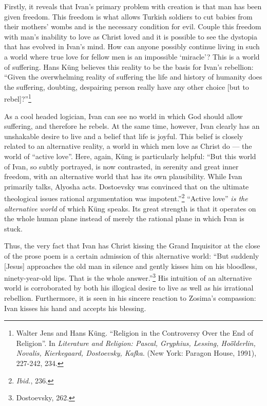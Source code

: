 Firstly, it reveals that Ivan's primary problem with creation is that man has been given freedom. This freedom is what allows Turkish soldiers to cut babies from their mothers' wombs and is the necessary condition for evil. Couple this freedom with man's inability to love as Christ loved and it is possible to see the dystopia that has evolved in Ivan's mind. How can anyone possibly continue living in such a world where true love for fellow men is an impossible `miracle'? This is a world of suffering. Hans K\"{u}ng believes this reality to be the basis for Ivan's rebellion: ``Given the overwhelming reality of suffering the life and history of humanity does the suffering, doubting, despairing person really have any other choice [but to rebel]?''\footnote{Walter Jens and Hans K\"{u}ng. ``Religion in the Controversy Over the End of Religion''. In \emph{Literature and Religion: Pascal, Gryphius, Lessing, Ho\"{o}̈lderlin, Novalis, Kierkegaard, Dostoevsky, Kafka}. (New York: Paragon House, 1991), 227-242, 234.}

As a cool headed logician, Ivan can see no world in which God should allow suffering, and therefore he rebels. At the same time, however, Ivan clearly has an unshakable desire to live and a belief that life is joyful. This belief is closely related to an alternative reality, a world in which men love as Christ do --- the world of ``active love''. Here, again, K\"{u}ng is particularly helpful: ``But this world of Ivan, so subtly portrayed, is now contrasted, in serenity and great inner freedom, with an alternative world that has its own plausibility. While Ivan primarily talks, Alyosha acts. Dostoevsky was convinced that on the ultimate theological issues rational argumentation was impotent.''\footnote{\emph{Ibid.}, 236.} ``Active love'' \emph{is the alternative world} of which K\"{u}ng speaks. Its great strength is that it operates on the whole human plane instead of merely the rational plane in which Ivan is stuck.

Thus, the very fact that Ivan has Christ kissing the Grand Inquisitor at the close of the prose poem is a certain admission of this alternative world: ``But suddenly [Jesus] approaches the old man in silence and gently kisses him on his bloodless, ninety-year-old lips. That is the whole answer.''\footnote{Dostoevsky, 262.} His intuition of an alternative world is corroborated by both his illogical desire to live as well as his irrational rebellion. Furthermore, it is seen in his sincere reaction to Zosima's compassion: Ivan kisses his hand and accepts his blessing.

